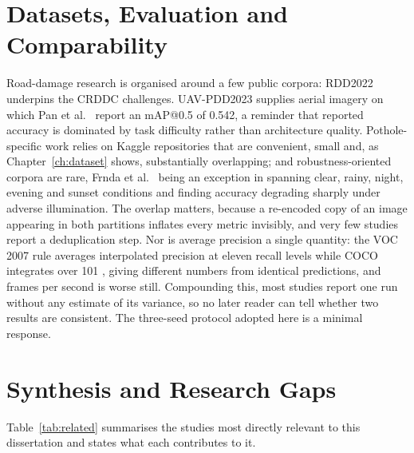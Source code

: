 \documentclass[MScCS]{uccthesis}
\begin{document}
\section{Datasets, Evaluation and Comparability}
\label{sec:datasets_related}

Road-damage research is organised around a few public corpora: RDD2022
\parencite{arya2022rdd2022} underpins the CRDDC challenges. UAV-PDD2023 supplies
aerial imagery on which Pan et al.~\parencite{pan2025realtime} report an mAP@0.5
of 0.542, a reminder that reported accuracy is dominated by task difficulty
rather than architecture quality. Pothole-specific work relies on Kaggle
repositories \parencite{chitholian_dataset,andrewmvd_dataset,ashishkumarak_dataset}
that are convenient, small and, as Chapter~\ref{ch:dataset} shows, substantially
overlapping; and robustness-oriented corpora are rare, Frnda et
al.~\parencite{frnda2024analysis} being an exception in spanning clear, rainy,
night, evening and sunset conditions and finding accuracy degrading sharply
under adverse illumination. The overlap matters, because a re-encoded copy of an
image appearing in both partitions inflates every metric invisibly, and very few
studies report a deduplication step. Nor is average precision a single quantity:
the VOC 2007 rule averages interpolated precision at eleven recall levels while
COCO integrates over 101 \parencite{everingham2010pascal,lin2014microsoft},
giving different numbers from identical predictions, and frames per second is
worse still. Compounding this, most studies report one run without any estimate
of its variance, so no later reader can tell whether two results are consistent.
The three-seed protocol adopted here is a minimal response.


\section{Synthesis and Research Gaps}
\label{sec:related_synthesis}

Table~\ref{tab:related} summarises the studies most directly relevant to this
dissertation and states what each contributes to it.
\end{document}
